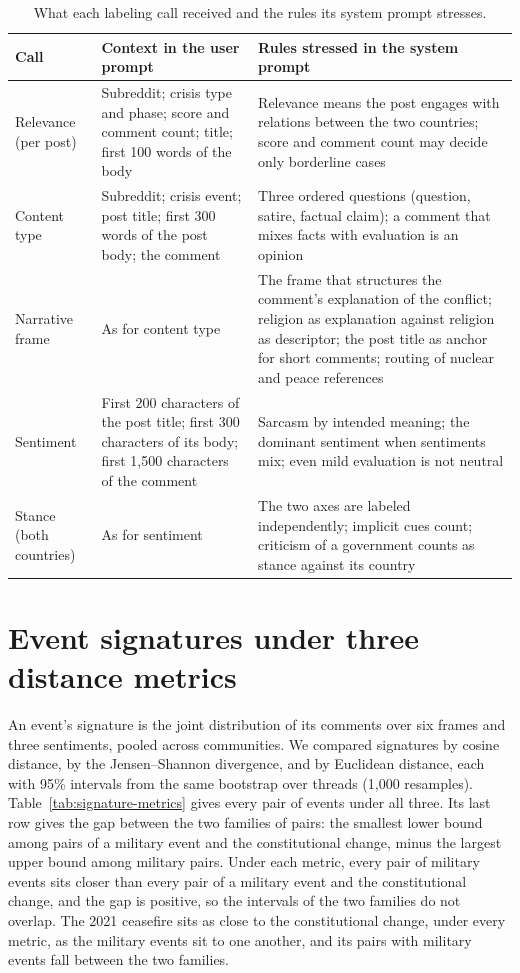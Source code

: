 \begin{table}[htbp]
\centering
\caption{What each labeling call received and the rules its system prompt
stresses.}
\label{tab:prompts}
\footnotesize
\begin{tabularx}{\linewidth}{@{}p{2.3cm}p{5.2cm}X@{}}
\toprule
Call & Context in the user prompt & Rules stressed in the system prompt \\
\midrule
Relevance (per post) & Subreddit; crisis type and phase; score and comment
count; title; first 100 words of the body & Relevance means the post engages
with relations between the two countries; score and comment count may decide only
borderline cases \\
\addlinespace
Content type & Subreddit; crisis event; post title; first 300 words of the
post body; the comment & Three ordered questions (question, satire, factual
claim); a comment that mixes facts with evaluation is an opinion \\
\addlinespace
Narrative frame & As for content type & The frame that structures the comment's
explanation of the conflict; religion as explanation against religion as
descriptor; the post title as anchor for short comments; routing of nuclear
and peace references \\
\addlinespace
Sentiment & First 200 characters of the post title; first 300 characters of
its body; first 1,500 characters of the comment & Sarcasm by intended meaning; the
dominant sentiment when sentiments mix; even mild evaluation is not neutral \\
\addlinespace
Stance (both countries) & As for sentiment & The two axes are labeled
independently; implicit cues count; criticism of a government counts as stance
against its country \\
\bottomrule
\end{tabularx}
\end{table}


\section{Event signatures under three distance metrics}
\label{app:signature}

An event's signature is the joint distribution of its comments over six frames
and three sentiments, pooled across communities. We compared signatures by cosine
distance, by the Jensen--Shannon divergence, and by Euclidean distance, each with
95\% intervals from the same bootstrap over threads (1,000 resamples).
Table~\ref{tab:signature-metrics} gives every pair of events under all three. Its
last row gives the gap between the two families of pairs: the smallest lower
bound among pairs of a military event and the constitutional change, minus the
largest upper bound among military pairs. Under each metric, every pair of
military events sits closer than every pair of a military event and the
constitutional change, and the gap is positive, so the intervals of the two
families do not overlap. The 2021 ceasefire sits as close to the constitutional
change, under every metric, as the military events sit to one another, and its
pairs with military events fall between the two families.

